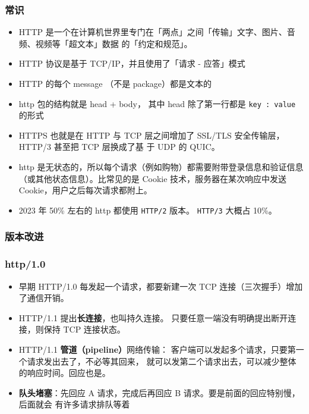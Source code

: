 
\begin{issues}
\issueDraft
\end{issues}

\subsubsection{常识}
\begin{itemize}
\item HTTP 是一个在计算机世界里专门在「两点」之间「传输」文字、图片、音频、视频等「超文本」数据 的「约定和规范」。
\item HTTP 协议是基于  TCP/IP，并且使用了「请求 - 应答」模式
\item HTTP 的每个 message （不是 package）都是文本的
\item http 包的结构就是 head + body， 其中 head 除了第一行都是 \verb`key : value` 的形式
\item HTTPS 也就是在 HTTP 与 TCP 层之间增加了 SSL/TLS 安全传输层，HTTP/3 甚至把 TCP 层换成了基 于 UDP 的 QUIC。
\item http 是无状态的，所以每个请求（例如购物）都需要附带登录信息和验证信息（或其他状态信息）。比常见的是 Cookie 技术，服务器在某次响应中发送 Cookie，用户之后每次请求都附上。
\item 2023 年 50\% 左右的 http 都使用 \verb`HTTP/2` 版本。 \verb`HTTP/3` 大概占 10\%。
\end{itemize}

\subsubsection{版本改进}
\subsubsection{http/1.0}
\begin{itemize}
\item 早期 HTTP/1.0 每发起一个请求，都要新建一次 TCP 连接（三次握手）增加了通信开销。
\item HTTP/1.1 提出\textbf{长连接}，也叫持久连接。 只要任意一端没有明确提出断开连接，则保持 TCP 连接状态。
\item HTTP/1.1 \textbf{管道（pipeline）}网络传输： 客户端可以发起多个请求，只要第一个请求发出去了，不必等其回来， 就可以发第二个请求出去，可以减少整体的响应时间。回应也是。
\item \textbf{队头堵塞}：先回应 A 请求，完成后再回应 B 请求。要是前面的回应特别慢，后面就会 有许多请求排队等着
\end{itemize}

